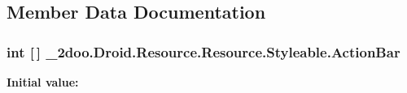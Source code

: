 \subsection{Member Data Documentation}
\hypertarget{class__2doo_1_1_droid_1_1_resource_1_1_styleable_565594acc9f8b831913b54b310db27f1}{
\subsubsection[{ActionBar}]{\setlength{\rightskip}{0pt plus 5cm}int \mbox{[}$\,$\mbox{]} \_\-2doo.Droid.Resource.Resource.Styleable.ActionBar}}
\label{class__2doo_1_1_droid_1_1_resource_1_1_styleable_565594acc9f8b831913b54b310db27f1}


\textbf{Initial value:}

